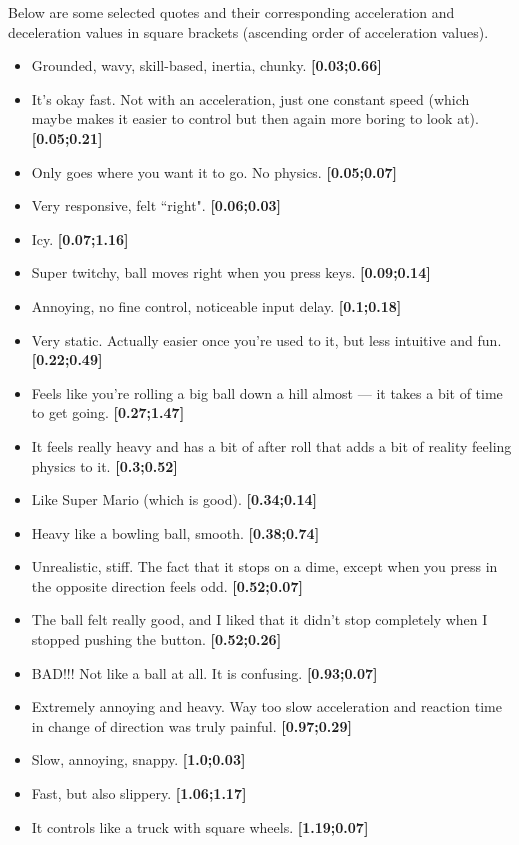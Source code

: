 Below are some selected quotes and their corresponding acceleration and deceleration values in square brackets (ascending order of acceleration values).
\begin{itemize}[noitemsep,nolistsep]
\item Grounded, wavy, skill-based, inertia, chunky. \textbf{[0.03;0.66]}
\item It's okay fast. Not with an acceleration, just one constant speed (which maybe makes it easier to control but then again more boring to look at). \textbf{[0.05;0.21]}
\item Only goes where you want it to go. No physics. \textbf{[0.05;0.07]}
\item Very responsive, felt ``right". \textbf{[0.06;0.03]}
\item Icy. \textbf{[0.07;1.16]}
\item Super twitchy, ball moves right when you press keys. \textbf{[0.09;0.14]}
\item Annoying, no fine control, noticeable input delay. \textbf{[0.1;0.18]}
\item Very static. Actually easier once you're used to it, but less intuitive and fun. \textbf{[0.22;0.49]}
\item Feels like you're rolling a big ball down a hill almost --- it takes a bit of time to get going. \textbf{[0.27;1.47]}
\item It feels really heavy and has a bit of after roll that adds a bit of reality feeling physics to it. \textbf{[0.3;0.52]}
\item Like Super Mario (which is good). \textbf{[0.34;0.14]}
\item Heavy like a bowling ball, smooth. \textbf{[0.38;0.74]}
\item Unrealistic, stiff. The fact that it stops on a dime, except when you press in the opposite direction feels odd. \textbf{[0.52;0.07]}
\item The ball felt really good, and I liked that it didn't stop completely when I stopped pushing the button. \textbf{[0.52;0.26]}
\item BAD!!! Not like a ball at all. It is confusing. \textbf{[0.93;0.07]}
\item Extremely annoying and heavy. Way too slow acceleration and reaction time in change of direction was truly painful. \textbf{[0.97;0.29]}
\item Slow, annoying, snappy. \textbf{[1.0;0.03]}
\item Fast, but also slippery. \textbf{[1.06;1.17]}
\item It controls like a truck with square wheels. \textbf{[1.19;0.07]}

\end{itemize}
